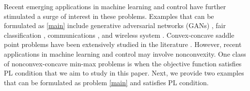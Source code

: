 \documentclass[letterpaper,11 pt]{article}
\begin{document}
Recent emerging applications
in machine learning and control have further stimulated a surge of interest in these problems. Examples that can be formulated as \eqref{main} include generative adversarial
networks (GANs) \cite{goodfellow2016deep},  fair  classification \cite{nouiehed2019solving}, communications \cite{akhtar2021conservative,bedi2019asynchronous}, and wireless system \cite{chen2011convergence,feijer2009krasovskii}. 
Convex-concave saddle point problems have been extensively studied in the literature \cite{chambolle2016ergodic,hamedani2021primal}. However, recent applications in machine learning and control may involve nonconvexity. One class of nonconvex-concave min-max problems is when the objective function satisfies PL condition that we aim to study in this paper. Next, we provide two examples that can be formulated as problem \eqref{main} and satisfies PL condition. 
\end{document}
